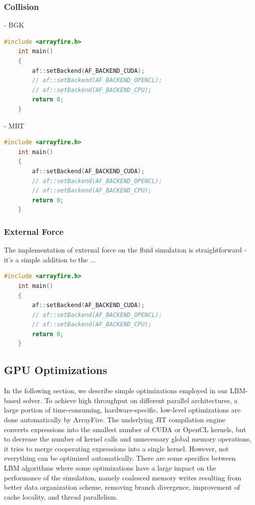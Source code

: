 \subsubsection{Collision}



- BGK \\

\begin{lstlisting}[language=Cpp, caption=C++ code for setting different computing backends., label=cpp-backends]
	#include <arrayfire.h>
	int main()
	{
		af::setBackend(AF_BACKEND_CUDA);
		// af::setBackend(AF_BACKEND_OPENCL);
		// af::setBackend(AF_BACKEND_CPU);
		return 0;
	}
\end{lstlisting}

- MRT \\

\begin{lstlisting}[language=Cpp, caption=C++ code for setting different computing backends., label=cpp-backends]
	#include <arrayfire.h>
	int main()
	{
		af::setBackend(AF_BACKEND_CUDA);
		// af::setBackend(AF_BACKEND_OPENCL);
		// af::setBackend(AF_BACKEND_CPU);
		return 0;
	}
\end{lstlisting}

\subsubsection{External Force}

The implementation of external force on the fluid simulation is straightforward - it's a simple addition to the ...

\begin{lstlisting}[language=Cpp, caption=C++ code for setting different computing backends., label=cpp-backends]
	#include <arrayfire.h>
	int main()
	{
		af::setBackend(AF_BACKEND_CUDA);
		// af::setBackend(AF_BACKEND_OPENCL);
		// af::setBackend(AF_BACKEND_CPU);
		return 0;
	}
\end{lstlisting}

\subsection{GPU Optimizations}
\label{optimizations-for-gpu}

In the following section, we describe simple optimizations employed in our LBM-based solver. To achieve high throughput on different parallel architectures, a large portion of time-consuming, hardware-specific, low-level optimizations are done automatically by ArrayFire. The underlying JIT compilation engine converts expressions into the smallest number of CUDA or OpenCL kernels, but to decrease the number of kernel calls and unnecessary global memory operations, it tries to merge cooperating expressions into a single kernel. However, not everything can be optimized automatically. There are some specifics between LBM algorithms where some optimizations have a large impact on the performance of the simulation, namely coalesced memory writes resulting from better data organization scheme, removing branch divergence, improvement of cache locality, and thread parallelism.


